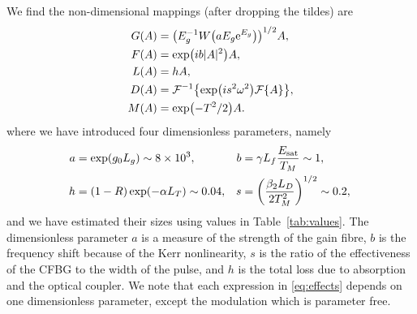 \documentclass[9pt,twocolumn,twoside]{osajnl}
\let\originalleft\left
\let\originalright\right
\renewcommand{\left}{\mathopen{}\mathclose\bgroup\originalleft}
\renewcommand{\right}{\aftergroup\egroup\originalright}
\newcommand{\Es}{E_{\textrm{sat}}} %
\newcommand{\FT}[1]{\mathcal{F}\left\{ #1 \right\}} %
\newcommand{\FTi}[1]{\mathcal{F}^{-1}\left\{ #1 \right\}} %
\begin{document}
We find the non-dimensional mappings (after dropping the tildes) are
\begin{equation}
	\begin{aligned}
		G(A) &= \left(E_g^{-1} W \left( a E_g \textrm{e}^{E_g}\right) \right)^{1/2} A,\\
		F(A) &= \exp \left( i b |A|^2 \right) A, \\
		L(A) &= h A, \\
		D(A) &= \FTi{\exp \left( i s^2 \omega^2 \right) \FT{A}}, \\
		M(A) &= \exp \left( -T^2 / 2 \right) A.
	\end{aligned}
	\label{eq:effects}
\end{equation}
where we have introduced four dimensionless parameters, namely
\begin{equation}
	\hspace*{-1mm}
	\begin{aligned}
		a &= \exp( g_0 L_g ) \sim 8 \times 10^3, & 
		b &= \gamma L_f \frac{\Es}{T_M} \sim 1, \\
		h &= (1 - R) \exp( - \alpha L_T) \sim 0.04, &
		s &= \left( \frac{\beta_2 L_D}{2 T_M^2} \right)^{1/2} \sim 0.2,	
	\end{aligned}
	\label{eq:ndparam}
\end{equation}
and we have estimated their sizes using values in Table~\ref{tab:values}. The dimensionless parameter $a$ is a measure of the strength of the gain fibre, $b$ is the frequency shift because of the Kerr nonlinearity, $s$ is the ratio of the effectiveness of the CFBG to the width of the pulse, and $h$ is the total loss due to absorption and the optical coupler. We note that each expression in \eqref{eq:effects} depends on one dimensionless parameter, except the modulation which is parameter free.
\end{document}
